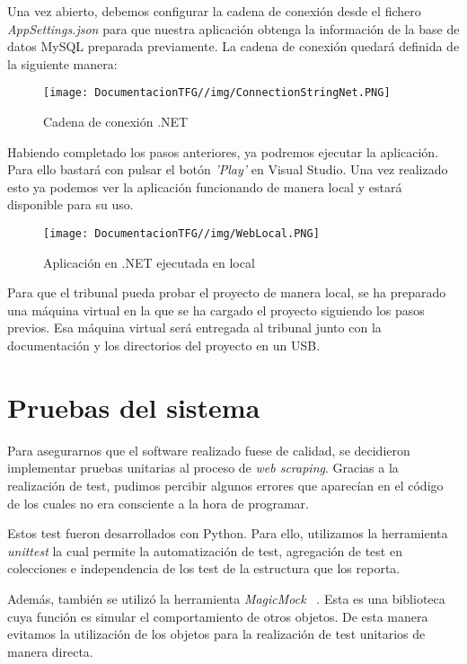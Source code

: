 Una vez abierto, debemos configurar la cadena de conexión desde el fichero \textit{AppSettings.json} para que nuestra aplicación obtenga la información de la base de datos MySQL preparada previamente. La cadena de conexión quedará definida de la siguiente manera:

\begin{figure}[H]
    \centering
    \texttt{[image: DocumentacionTFG//img/ConnectionStringNet.PNG]}
    \caption{Cadena de conexión .NET}
\end{figure}

Habiendo completado los pasos anteriores, ya podremos ejecutar la aplicación. Para ello bastará con pulsar el botón \textit{'Play'} en Visual Studio. Una vez realizado esto ya podemos ver la aplicación funcionando de manera local y estará disponible para su uso.

\begin{figure}[H]
    \centering
    \texttt{[image: DocumentacionTFG//img/WebLocal.PNG]}
    \caption{Aplicación en .NET ejecutada en local}
\end{figure}

Para que el tribunal pueda probar el proyecto de manera local, se ha preparado una máquina virtual en la que se ha cargado el proyecto siguiendo los pasos previos. Esa máquina virtual será entregada al tribunal junto con la documentación y los directorios del proyecto en un USB.

\section{Pruebas del sistema}
Para asegurarnos que el software realizado fuese de calidad, se decidieron implementar pruebas unitarias al proceso de \textit{web scraping}. Gracias a la realización de test, pudimos percibir algunos errores que aparecían en el código de los cuales no era consciente a la hora de programar. 

Estos test fueron desarrollados con Python. Para ello, utilizamos la herramienta \textit{unittest} la cual permite la automatización de test, agregación de test en colecciones e independencia de los test de la estructura que los reporta.

Además, también se utilizó la herramienta  \textit{MagicMock} ~\cite{mock:latex}. Esta es una biblioteca cuya función es simular el comportamiento de otros objetos. De esta manera evitamos la utilización de los objetos para la realización de test unitarios de manera directa.


